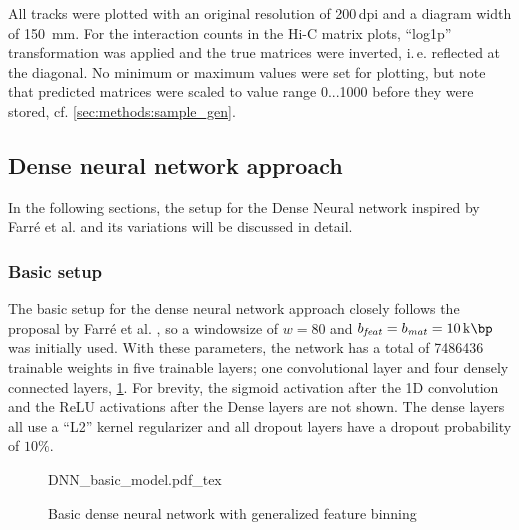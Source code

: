 All tracks were plotted with an original resolution of 200\,dpi and a diagram width of \SI{150}{\mm}.
For the interaction counts in the Hi-C matrix plots, ``log1p'' transformation was applied and the true matrices were inverted,
i.\,e. reflected at the diagonal. 
No minimum or maximum values were set for plotting, but note that predicted matrices were scaled to value range 0...1000 
before they were stored, cf. \cref{sec:methods:sample_gen}.

\subsection{Dense neural network approach} \label{sec:methods:dnn}
In the following sections, the setup for the Dense Neural network inspired by Farr\'e et al. \cite{Farre2018a}
and its variations will be discussed in detail.

\subsubsection{Basic setup} \label{sec:methods:basicSetup}
The basic setup for the dense neural network approach closely follows the proposal by Farr\'e et al. \cite{Farre2018a},
so a windowsize of $w=80$ and $b_\mathit{feat}=b_\mathit{mat} = \SI{10}{\kilo\bp}$ was initially used.
With these parameters, the network has a total of \SI{7486436}{} trainable weights in five trainable layers; 
one convolutional layer and four densely connected layers, \cref{fig:methods:basic_dnn}.
For brevity, the sigmoid activation after the 1D convolution and the ReLU activations after the Dense layers are not shown.
The dense layers all use a ``L2'' kernel regularizer and all dropout layers have a dropout probability of $10\%$.
\begin{figure}[htb]
    \small
    \centering
    {DNN_basic_model.pdf_tex}
    \caption{Basic dense neural network with generalized feature binning}
    \label{fig:methods:basic_dnn}
\end{figure}

